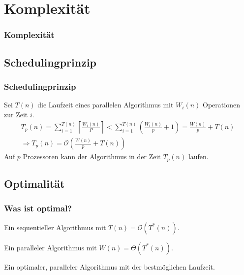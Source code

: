 \section{Komplexität}
\begin{frame}
    \frametitle{Komplexität}
    \tableofcontents[
        currentsection,
        hideothersubsections,
        sectionstyle=show/shaded,
    ]
\end{frame}

\subsection{Schedulingprinzip}
\begin{frame}
    \frametitle{Schedulingprinzip}
    Sei $T(n)$ die Laufzeit eines parallelen Algorithmus mit $W_i(n)$
    Operationen zur Zeit $i$.
    \begin{equation}
        \begin{gathered}
            T_p(n) = \sum_{i=1}^{T(n)} \left\lceil \frac{W_i(n)}{P} \right\rceil
            <
            \sum_{i=1}^{T(n)} \left( \frac{W_i(n)}{p} + 1 \right)
            = \frac{W(n)}{p} + T(n) \\
            \Rightarrow T_p(n) = \mathcal{O} \left( \frac{W(n)}{p} + T(n) \right)
        \end{gathered}
    \end{equation}
    Auf $p$ Prozessoren kann der Algorithmus in der Zeit $T_p(n)$ laufen.
\end{frame}

\subsection{Optimalität}
\begin{frame}
    \frametitle{Was ist optimal?}
    \begin{definition}
        Ein sequentieller Algorithmus mit $T(n) = \mathcal{O}(T^\ast(n))$.
    \end{definition}
    \begin{definition}[optimal]
        Ein paralleler Algorithmus mit $W(n) = \Theta(T^\ast(n))$.
    \end{definition}
    \begin{definition}
        Ein optimaler, paralleler Algorithmus mit der bestmöglichen Laufzeit.
    \end{definition}
\end{frame}

